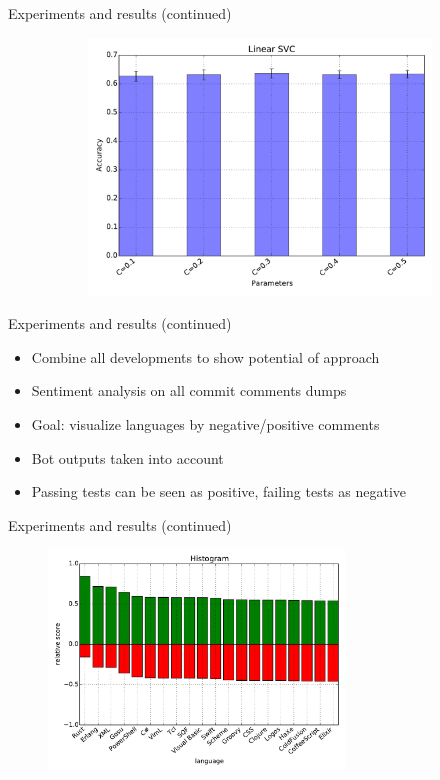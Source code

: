 \documentclass[t,11pt]{beamer}
\begin{document}
\begin{frame}[fragile]{Experiments and results (continued)}
\begin{figure}
\begin{subfigure}[b]{0.4\textwidth}
      \includegraphics[width=\textwidth]{../plots/experiment_results-Linear_SVC.pdf}
    \end{subfigure}
  \end{figure}
\end{frame}

\begin{frame}[fragile]{Experiments and results (continued)}
\begin{itemize}
  \item Combine all developments to show potential of approach
  \item Sentiment analysis on all commit comments dumps
  \item Goal: visualize languages by negative/positive comments
  \item Bot outputs taken into account
  \item Passing tests can be seen as positive, failing tests as negative
\end{itemize}
\end{frame}

\begin{frame}[fragile]{Experiments and results (continued)}
  \begin{figure}
    \centering
    \includegraphics[width=0.7\textwidth]{../plots/all-language-PassiveAggressive-pos.pdf}
  \end{figure}
\end{frame}
\end{document}
